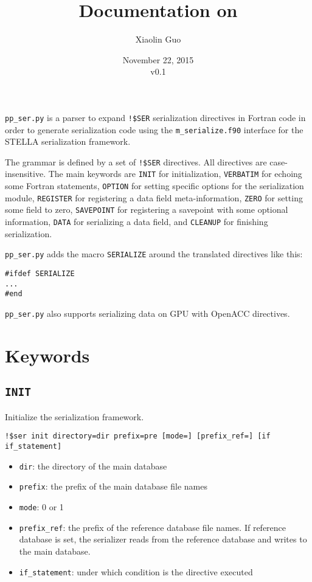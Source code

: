 \documentclass{article}
\title{Documentation on \ppser}
\author{Xiaolin Guo}
\date{November 22, 2015\\\vspace{1em}v0.1}
\newcommand{\ppser}{\texttt{pp\_ser.py}}
\begin{document}
\maketitle

\ppser{} is a parser to expand \texttt{!\$SER} serialization directives in Fortran code in order to generate serialization code using the \texttt{m\_serialize.f90} interface for the STELLA serialization framework.

The grammar is defined by a set of \texttt{!\$SER} directives. All directives are case-insensitive. The main keywords are \texttt{INIT} for initialization, \texttt{VERBATIM} for echoing some Fortran statements, \texttt{OPTION} for setting specific options for the serialization module, \texttt{REGISTER} for registering a data field meta-information, \texttt{ZERO} for setting some field to zero, \texttt{SAVEPOINT} for registering a savepoint with some optional information, \texttt{DATA} for serializing a data field, and \texttt{CLEANUP} for finishing serialization.

\ppser{} adds the macro \texttt{SERIALIZE} around the translated directives like this:
\begin{lstlisting}
#ifdef SERIALIZE
...
#end
\end{lstlisting}

\ppser{} also supports serializing data on GPU with OpenACC directives.

\section{Keywords}

\subsection{\texttt{INIT}}
Initialize the serialization framework.

\begin{lstlisting}
!$ser init directory=dir prefix=pre [mode=] [prefix_ref=] [if if_statement]
\end{lstlisting}

\begin{itemize}
\item \texttt{dir}: the directory of the main database
\item \texttt{prefix}: the prefix of the main database file names
\item \texttt{mode}: 0 or 1
\item \texttt{prefix\_ref}: the prefix of the reference database file names. If reference database is set, the serializer reads from the reference database and writes to the main database.
\item \texttt{if\_statement}: under which condition is the directive executed
\end{itemize}
\end{document}
